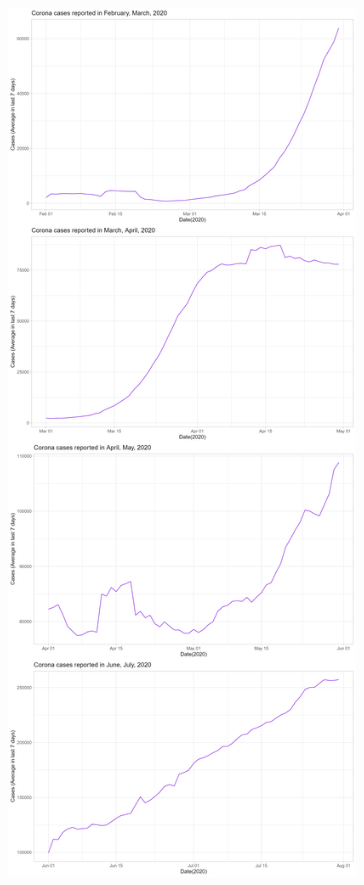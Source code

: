 \documentclass[a4paper]{article}
\theoremstyle{definition}
\begin{document}
\begin{enumerate}[i)]
\begin{enumerate}[1)]
\begin{figure}[H]
				\includegraphics[height=23cm,width=13cm]{images/8.3.1.png}
			\end{figure}
			\begin{figure}[H]
				\centering

\end{figure}
\end{enumerate}
\end{enumerate}
\end{document}
